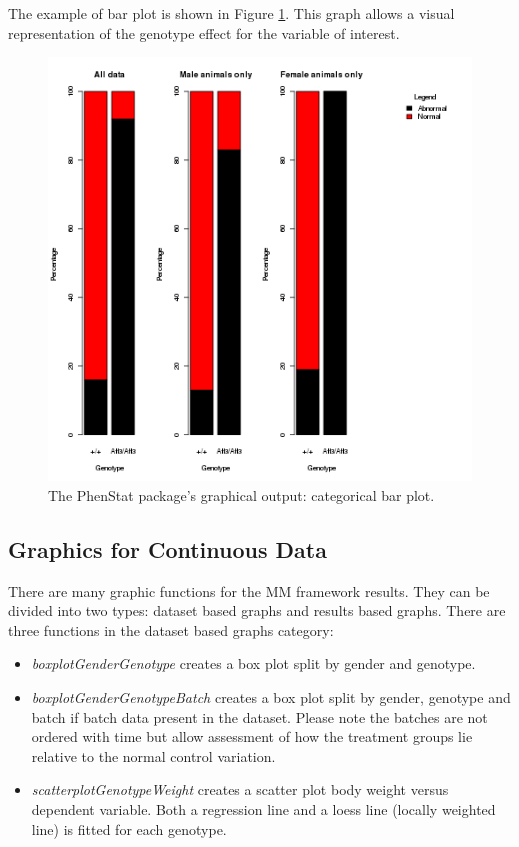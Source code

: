 \documentclass[12pt,a4paper]{article}
\begin{document}
The example of bar plot is shown in Figure \ref{fig:05}. This graph allows a visual representation of the genotype effect for the variable of interest.
\begin{figure}[!htpb]%
\centerline{\includegraphics[scale=0.5]{categoricalBarPlot.png}}
\caption{The PhenStat package's graphical output: categorical bar plot.}\label{fig:05}
\end{figure}

\subsection{Graphics for Continuous Data}
There are many graphic functions for the MM framework results. They can be divided into two types: dataset based graphs and results based graphs.
There are three functions in the dataset based graphs category:
\begin{itemize}
\item \textit{boxplotGenderGenotype} creates a box plot split by gender and genotype.
\item \textit{boxplotGenderGenotypeBatch} creates a box plot split by gender, genotype and batch if batch data present in the dataset. Please note the batches are not ordered with time but allow assessment of how the treatment groups lie relative to the normal control variation.
\item \textit{scatterplotGenotypeWeight} creates a scatter plot body weight versus dependent variable. Both a regression line and a loess line (locally weighted line) is fitted for each genotype.
\end{itemize}
\end{document}
